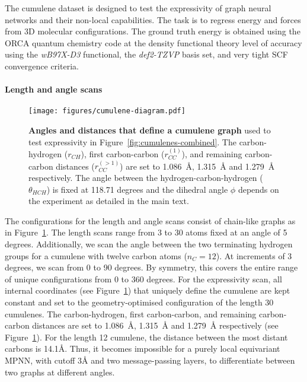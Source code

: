 \documentclass{article} \usepackage{iclr2024_conference,times}
\begin{document}
The cumulene dataset is designed to test the expressivity of graph neural networks and their non-local capabilities. The task is to regress energy and forces from 3D molecular configurations. The ground truth energy is obtained using the ORCA quantum chemistry code at the density functional theory level of accuracy using the \textit{wB97X-D3} functional, the \textit{def2-TZVP} basis set, and very tight SCF convergence criteria. 


\paragraph{Length and angle scans}
\begin{figure}[h!t]
    \centering
    \texttt{[image: figures/cumulene-diagram.pdf]}
    \caption{\textbf{Angles and distances that define a cumulene graph} used to test expressivity in Figure~\ref{fig:cumulenes-combined}. The carbon-hydrogen ($r_{CH}$), first carbon-carbon ($r_{CC}^{(1)}$), and remaining carbon-carbon distances ($r_{CC}^{(>1)}$) are set to 1.086~\AA{}, 1.315~\AA{} and 1.279~\AA{} respectively. The angle between the hydrogen-carbon-hydrogen ($\theta_{HCH}$) is fixed at 118.71 degrees and the dihedral angle $\phi$ depends on the experiment as detailed in the main text.}
    \label{fig:appendix-cumulene-graph}
\end{figure}
The configurations for the length and angle scans consist of chain-like graphs as in Figure~\ref{fig:appendix-cumulene-graph}. The length scans range from 3 to 30 atoms fixed at an angle of 5 degrees. Additionally, we scan the angle between the two terminating hydrogen groups for a cumulene with twelve carbon atoms ($n_C = 12$). At increments of 3 degrees, we scan from 0 to 90 degrees. By symmetry, this covers the entire range of unique configurations from 0 to 360 degrees. For the expressivity scan, all internal coordinates (see Figure~\ref{fig:appendix-cumulene-graph}) that uniquely define the cumulene are kept constant and set to the geometry-optimised configuration of the length 30 cumulenes. The carbon-hydrogen, first carbon-carbon, and remaining carbon-carbon distances are set to 1.086~\AA{}, 1.315~\AA{} and 1.279~\AA{} respectively (see Figure~\ref{fig:appendix-cumulene-graph}). For the length 12 cumulene, the distance between the most distant carbons is 14.1\AA{}. Thus, it becomes impossible for a purely local equivariant MPNN, with cutoff 3\AA{} and two message-passing layers, to differentiate between two graphs at different angles. 
\end{document}
